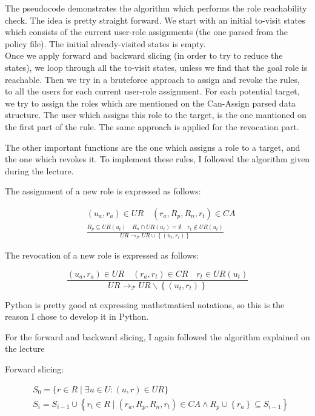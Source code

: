 \documentclass[12pt]{article}
\begin{document}
The pseudocode demonstrates the algorithm which performs the role reachability check.
The idea is pretty straight forward. We start with an initial to-visit states which consists of the current user-role
assignments (the one parsed from the policy file). The initial already-visited states is empty. \\

Once we apply forward and backward slicing (in order to try to reduce the states), we loop through all the to-visit states,
unless we find that the goal role is reachable. Then we try in a bruteforce approach to assign and revoke the rules, to all the
users for each current user-role assignment.
For each potential target, we try to assign the roles which are mentioned on the Can-Assign parsed data structure.
The user which assigns this role to the target, is the one mantioned on the first part of the rule.
The same approach is applied for the revocation part.


The other important functions are the one which assigns a role to a target, and the one which revokes it.
To implement these rules, I followed the algorithm given during the lecture. 

The assignment of a new role is expressed as follows:

$$ \begin{aligned}
&\left(u_{a}, r_{a}\right) \in U R \quad\left(r_{a}, R_{p}, R_{n}, r_{t}\right) \in C A\\
&\frac{R_{p} \subseteq U R\left(u_{t}\right) \quad R_{n} \cap U R\left(u_{t}\right)=\emptyset \quad r_{t} \notin U R\left(u_{t}\right)}{U R \rightarrow_{\mathcal{P}} U R \cup\left\{\left(u_{t}, r_{t}\right)\right\}}
\end{aligned} $$

The revocation of a new role is expressed as follows:

$$
\frac{\left(u_{a}, r_{a}\right) \in U R \quad\left(r_{a}, r_{t}\right) \in C R \quad r_{t} \in U R\left(u_{t}\right)}{U R \rightarrow_{\mathcal{P}} U R \backslash\left\{\left(u_{t}, r_{t}\right)\right\}}
$$

Python is pretty good at expressing mathetmatical notations, so this is the reason I chose to develop it in Python.

For the forward and backward slicing, I again followed the algorithm explained on the lecture

Forward slicing:

$$
\begin{aligned}
&S_{0}=\{r \in R \mid \exists u \in U:(u, r) \in U R\} \\
&S_{i}=S_{i-1} \cup\left\{r_{t} \in R \mid\left(r_{a}, R_{p}, R_{n}, r_{t}\right) \in C A \wedge R_{p} \cup\left\{r_{a}\right\} \subseteq S_{i-1}\right\}
\end{aligned}
$$
\end{document}
